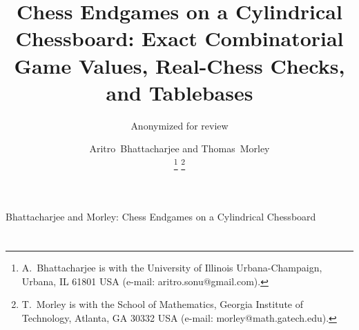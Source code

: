 \documentclass[journal]{IEEEtran}
\newif\ifsubmitted
\theoremstyle{ieeeplain}
\theoremstyle{ieeedef}
\begin{document}
\title{Chess Endgames on a Cylindrical Chessboard: Exact Combinatorial Game Values, Real-Chess Checks,
and Tablebases}

\ifdefined\anonbuild
\author{Anonymized for review}
\else
\ifsubmitted
  \newcommand{\ieeenotice}{\thanks{This work has been submitted to the IEEE for possible publication.
    Copyright may be transferred without notice, after which this version may no longer be accessible.}}
\else
  \newcommand{\ieeenotice}{}
\fi
\author{Aritro~Bhattacharjee and Thomas~Morley%
\ieeenotice
\thanks{A.~Bhattacharjee is with the University of Illinois Urbana-Champaign, Urbana, IL 61801 USA (e-mail: aritro.sonu@gmail.com).}%
\thanks{T.~Morley is with the School of Mathematics, Georgia Institute of Technology, Atlanta, GA 30332 USA (e-mail: morley@math.gatech.edu).}}
%
{Bhattacharjee and Morley: Chess Endgames on a Cylindrical Chessboard}
\fi

\maketitle



\ifdefined\anonbuild\else
\begingroup
\makeatletter
\footnotesize
\setcounter{tocdepth}{1}
\renewcommand{\l@section}[2]{\par\noindent\hangindent 2.4em #1\nobreak\hfill #2\par}
\renewcommand{\numberline}[1]{\makebox[2.4em][l]{#1}}
\section*{\contentsname}
\vspace{-0.4\baselineskip}
\makeatother
\endgroup
\vspace{0.3\baselineskip}
\fi

















\raggedbottom
\appendix[Positions]

\end{document}
